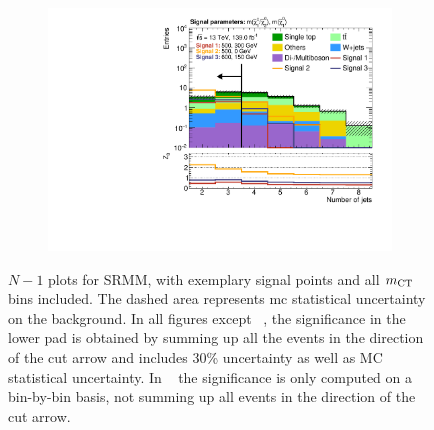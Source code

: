 \begin{figure}
\begin{subfigure}[b]{0.4\linewidth}
		\centering\includegraphics[width=\textwidth]{n1_SRMM_mct_bins/nJet30.pdf}
		\caption{\label{fig:Wh_reopt_second_round_n1_srmm_njet}}
	\end{subfigure}
	\caption{$N-1$ plots for SRMM, with exemplary signal points and all $m_{\textrm{CT}}$ bins included. The dashed area represents \gls{mc} statistical uncertainty on the background. In all figures except \figname~, the significance in the lower pad is obtained by summing up all the events in the direction of the cut arrow and includes 30\% uncertainty as well as MC statistical uncertainty. In \figname~ the significance is only computed on a bin-by-bin basis, \ie not summing up all events in the direction of the cut arrow.}
	\label{fig:Wh_reopt_second_round_n1_srmm}
\end{figure}

